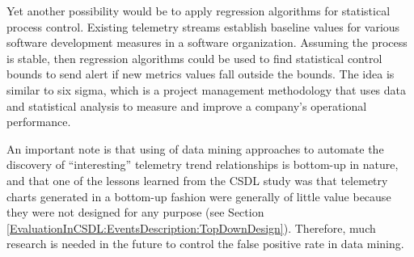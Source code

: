 Yet another possibility would be to apply regression algorithms for statistical process control. Existing telemetry streams establish baseline values for various software development measures in a software organization. Assuming the process is stable, then regression algorithms could be used to find statistical control bounds to send alert if new metrics values fall outside the bounds. The idea is similar to six sigma, which is a project management methodology that uses data and statistical analysis to measure and improve a company's operational performance. 

An important note is that using of data mining approaches to automate the discovery of ``interesting'' telemetry trend relationships is bottom-up in nature, and that one of the lessons learned from the CSDL study was that telemetry charts generated in a bottom-up fashion were generally of little value because they were not designed for any purpose (see Section \ref{EvaluationInCSDL:EventsDescription:TopDownDesign}). Therefore, much research is needed in the future to control the false positive rate in data mining. 






	 
	


